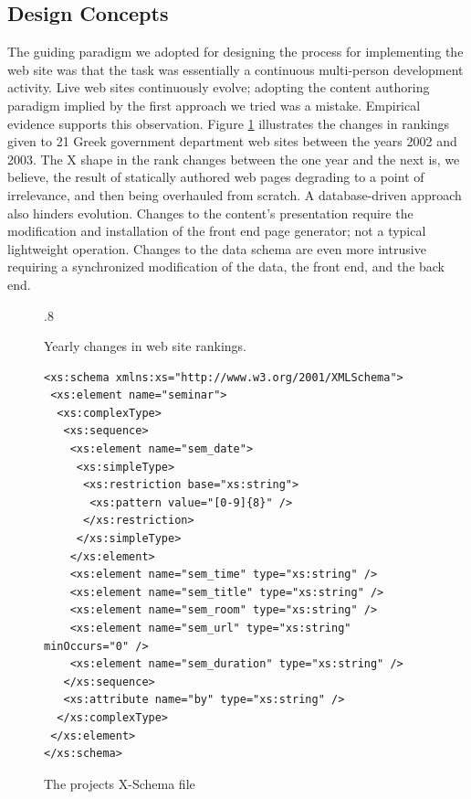 \documentclass[10pt]{article}
\def\epsfsize#1#2{\ifdim#1>\columnwidth\columnwidth\else#1\fi}
\begin{document}
\subsection{Design Concepts}

The guiding paradigm we adopted for designing the process
for implementing the web site was that the task was essentially
a continuous multi-person development activity.
Live web sites continuously evolve;
adopting the content authoring paradigm implied
by the first approach we tried was a mistake.
Empirical evidence supports this observation.
Figure \ref{fig:rankyear} illustrates the changes
in rankings given to 21 Greek government department
web sites between the years 2002 and 2003.
The X shape in the rank changes between the one year and the next
is, we believe, the result of statically authored web pages
degrading to a point of irrelevance, and then being overhauled
from scratch.
A database-driven approach also hinders evolution.
Changes to the content's presentation require the modification
and installation of the front end page generator;
not a typical lightweight operation.
Changes to the data schema are even more intrusive
requiring a synchronized modification of the data,
the front end, and the back end.

\label{sec:design}
\begin{figure}[h!]
\begin{center}
\leavevmode
\def\epsfsize#1#2{\epsfxsize}
\epsfysize.8\vsize
{}
\end{center}
\caption{
\label{fig:rankyear}
Yearly changes in web site rankings.}
\end{figure}


\begin{figure}
\lstset{language=MYLANG,basicstyle=\ttfamily}
{\begin{lstlisting}
<xs:schema xmlns:xs="http://www.w3.org/2001/XMLSchema">
 <xs:element name="seminar">
  <xs:complexType>
   <xs:sequence>
    <xs:element name="sem_date">
     <xs:simpleType>
      <xs:restriction base="xs:string">
       <xs:pattern value="[0-9]{8}" />
      </xs:restriction>
     </xs:simpleType>
    </xs:element>
    <xs:element name="sem_time" type="xs:string" />
    <xs:element name="sem_title" type="xs:string" />
    <xs:element name="sem_room" type="xs:string" />
    <xs:element name="sem_url" type="xs:string" minOccurs="0" />
    <xs:element name="sem_duration" type="xs:string" />
   </xs:sequence>
   <xs:attribute name="by" type="xs:string" />
  </xs:complexType>
 </xs:element>
</xs:schema>
\end{lstlisting}}
\caption{The projects X-Schema file}
\label{fig:project-dtd}
\end{figure}
\end{document}

